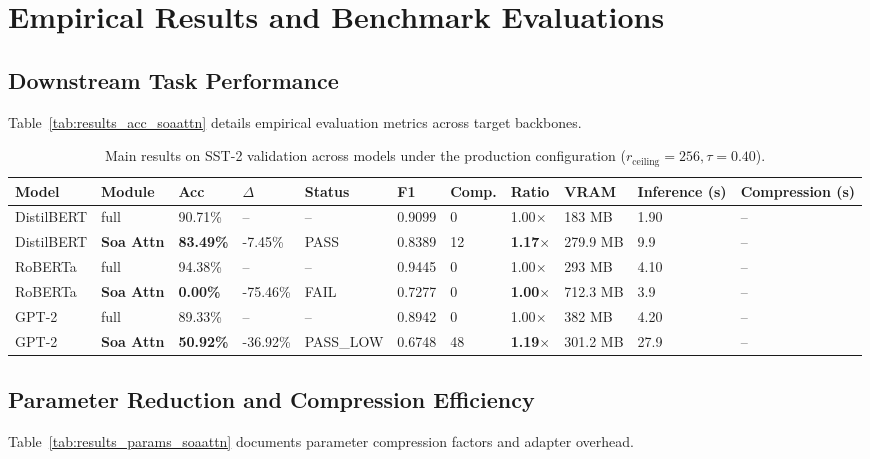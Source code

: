 \section{Empirical Results and Benchmark Evaluations}

\subsection{Downstream Task Performance}
Table~\ref{tab:results_acc_soaattn} details empirical evaluation metrics across target backbones.

\begin{table}[t]
\centering
\small
\begin{tabular}{lllllllllll}
\toprule
\textbf{Model} & \textbf{Module} & \textbf{Acc} & \textbf{$\Delta$} & \textbf{Status} & \textbf{F1} & \textbf{Comp.} & \textbf{Ratio} & \textbf{VRAM} & \textbf{Inference (s)} & \textbf{Compression (s)} \\
\midrule
DistilBERT & full & 90.71\% & -- & -- & 0.9099 & 0 & 1.00$\times$ & 183 MB & 1.90 & -- \\
DistilBERT & \textbf{Soa Attn} & \textbf{83.49\%} & -7.45\% & PASS & 0.8389 & 12 & \textbf{1.17$\times$} & 279.9 MB & 9.9 & -- \\
RoBERTa & full & 94.38\% & -- & -- & 0.9445 & 0 & 1.00$\times$ & 293 MB & 4.10 & -- \\
RoBERTa & \textbf{Soa Attn} & \textbf{0.00\%} & -75.46\% & FAIL & 0.7277 & 0 & \textbf{1.00$\times$} & 712.3 MB & 3.9 & -- \\
GPT-2 & full & 89.33\% & -- & -- & 0.8942 & 0 & 1.00$\times$ & 382 MB & 4.20 & -- \\
GPT-2 & \textbf{Soa Attn} & \textbf{50.92\%} & -36.92\% & PASS\_LOW & 0.6748 & 48 & \textbf{1.19$\times$} & 301.2 MB & 27.9 & -- \\
\bottomrule
\end{tabular}
\caption{Main results on SST-2 validation across models under the production configuration ($r_{\mathrm{ceiling}}=256, \tau=0.40$).}
\label{tab:main_sst2}
\end{table}

\subsection{Parameter Reduction and Compression Efficiency}
Table~\ref{tab:results_params_soaattn} documents parameter compression factors and adapter overhead.

